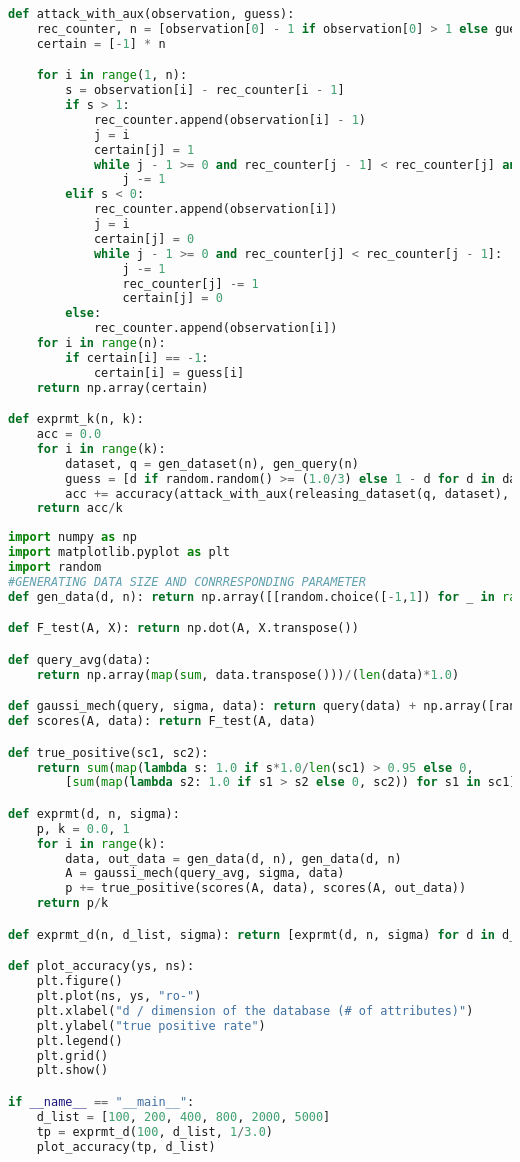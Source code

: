 \begin{lstlisting}[label=code-p1-2, language=Python, caption=Python Code For Attack with side Information]
def attack_with_aux(observation, guess):
	rec_counter, n = [observation[0] - 1 if observation[0] > 1 else guess[0]], len(observation)
	certain = [-1] * n

	for i in range(1, n):
		s = observation[i] - rec_counter[i - 1]
		if s > 1:
			rec_counter.append(observation[i] - 1)
			j = i
			certain[j] = 1
			while j - 1 >= 0 and rec_counter[j - 1] < rec_counter[j] and certain[j - 1] == -1:
				j -= 1
		elif s < 0:
			rec_counter.append(observation[i])
			j = i
			certain[j] = 0
			while j - 1 >= 0 and rec_counter[j] < rec_counter[j - 1]:
				j -= 1
				rec_counter[j] -= 1
				certain[j] = 0
		else:
			rec_counter.append(observation[i])
	for i in range(n):
		if certain[i] == -1:
			certain[i] = guess[i]
	return np.array(certain)

def exprmt_k(n, k):
	acc = 0.0
	for i in range(k):
		dataset, q = gen_dataset(n), gen_query(n)
		guess = [d if random.random() >= (1.0/3) else 1 - d for d in dataset]
		acc += accuracy(attack_with_aux(releasing_dataset(q, dataset), guess), dataset)
	return acc/k

\end{lstlisting}



\begin{lstlisting}[label = code-p2-2a, language=Python, caption=Python Code for Problem 2 - 2 - (a)]
import numpy as np
import matplotlib.pyplot as plt
import random
#GENERATING DATA SIZE AND CONRRESPONDING PARAMETER
def gen_data(d, n): return np.array([[random.choice([-1,1]) for _ in range(d)] for i in range(n)])

def F_test(A, X): return np.dot(A, X.transpose())

def query_avg(data):
	return np.array(map(sum, data.transpose()))/(len(data)*1.0)

def gaussi_mech(query, sigma, data): return query(data) + np.array([random.gauss(0, sigma) for _ in data[0]]) 
def scores(A, data): return F_test(A, data)

def true_positive(sc1, sc2):
	return sum(map(lambda s: 1.0 if s*1.0/len(sc1) > 0.95 else 0, 
		[sum(map(lambda s2: 1.0 if s1 > s2 else 0, sc2)) for s1 in sc1])) / len(sc1)

def exprmt(d, n, sigma):
	p, k = 0.0, 1
	for i in range(k):
		data, out_data = gen_data(d, n), gen_data(d, n)
		A = gaussi_mech(query_avg, sigma, data)
		p += true_positive(scores(A, data), scores(A, out_data))
	return p/k

def exprmt_d(n, d_list, sigma): return [exprmt(d, n, sigma) for d in d_list]

def plot_accuracy(ys, ns):
	plt.figure()
	plt.plot(ns, ys, "ro-")
	plt.xlabel("d / dimension of the database (# of attributes)")
	plt.ylabel("true positive rate")
	plt.legend()
	plt.grid()
	plt.show()

if __name__ == "__main__":
	d_list = [100, 200, 400, 800, 2000, 5000]
	tp = exprmt_d(100, d_list, 1/3.0)
	plot_accuracy(tp, d_list)

\end{lstlisting}


